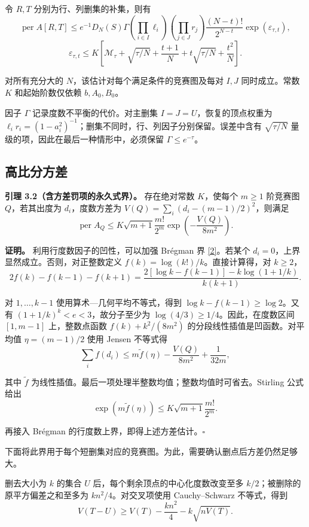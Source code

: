 \documentclass[11pt,a4paper]{article}
\makeatletter
\newcommand{\paperstatement}[3]{\par\addvspace{6pt}\Needspace{4\baselineskip}\phantomsection\def\@currentlabel{#2}\label{#3}\noindent\textbf{#1}\enspace}
\newcommand{\paperref}[2]{\hyperref[#1]{#2}}
\makeatother
\begin{document}
令 \(R,T\) 分别为行、列删集的补集，则有
\[\operatorname{per}A[R,T]\le
e^{-1}D_N(S)\Gamma
\left(\prod_{i\in I}\ell_i\right)
\left(\prod_{j\in J}r_j\right)
\frac{(N-t)!}{2^{N-t}}\exp(\varepsilon_{\tau,t}),\]
\nopagebreak[3]\[\varepsilon_{\tau,t}\le K\left[
\mathcal M_\tau+\sqrt{\tau/N}+\frac{t+1}{N}
+t\sqrt{\tau/N}+\frac{t^2}{N}\right].\]

对所有充分大的 \(N\)，该估计对每个满足条件的竞赛图及每对 \(I,J\) 同时成立。常数 \(K\) 和起始阶数仅依赖 \(b,A_0,B_0\)。

因子 \(\Gamma\) 记录度数不平衡的代价。对主删集 \(I=J=U\)，恢复的顶点权重为 \(\ell_i r_i=(1-a_i^2)^{-1}\)；删集不同时，行、列因子分别保留。误差中含有 \(\sqrt{\tau/N}\) 量级的项，因此在最后一种情形中，必须保留 \(\Gamma\le e^{-\tau}\)。

\subsection{高比分方差}\label{sec-3.2}

\paperstatement{引理 3.2（含方差罚项的永久式界）。}{3.2}{thm-3.2} 存在绝对常数 \(K\)，使每个 \(m\ge1\) 阶竞赛图 \(Q\)，若其出度为 \(d_i\)，度数方差为 \(V(Q)=\sum_i(d_i-(m-1)/2)^2\)，则满足
\[\operatorname{per}A_Q\le
K\sqrt{m+1}\frac{m!}{2^m}\exp\left(-\frac{V(Q)}{8m^2}\right).\]

\textbf{证明。} 利用行度数因子的凹性，可以加强 Brégman 界 \paperref{bib-2}{[2]}。若某个 \(d_i=0\)，上界显然成立。否则，对正整数定义 \(f(k)=\log(k!)/k\)。直接计算得，对 \(k\ge2\)，
\[2f(k)-f(k-1)-f(k+1)
=\frac{2[\log k-f(k-1)]-k\log(1+1/k)}{k(k+1)}.\]

对 \(1,\ldots,k-1\) 使用算术---几何平均不等式，得到 \(\log k-f(k-1)\ge\log2\)。又有 \((1+1/k)^k<e<3\)，故分子至少为 \(\log(4/3)\ge1/4\)。因此，在度数区间 \([1,m-1]\) 上，整数点函数 \(f(k)+k^2/(8m^2)\) 的分段线性插值是凹函数。对平均值 \(\eta=(m-1)/2\) 使用 Jensen 不等式得
\[\sum_i f(d_i)
\le m\widetilde f(\eta)-\frac{V(Q)}{8m^2}+\frac{1}{32m},\]

其中 \(\widetilde f\) 为线性插值。最后一项处理半整数均值；整数均值时可省去。Stirling 公式给出
\[\exp(m\widetilde f(\eta))\le K\sqrt{m+1}\frac{m!}{2^m}.\]

再接入 Brégman 的行度数上界，即得上述方差估计。\nobreak\hspace{.5em}\mbox{$\square$}

下面将此界用于每个短删集对应的竞赛图。为此，需要确认删点后方差仍然足够大。

删去大小为 \(k\) 的集合 \(U\) 后，每个剩余顶点的中心化度数改变至多 \(k/2\)；被删除的原平方偏差之和至多为 \(kn^2/4\)。对交叉项使用 Cauchy--Schwarz 不等式，得到
\[V(T-U)\ge V(T)-\frac{kn^2}{4}-k\sqrt{nV(T)}.\]
\end{document}
